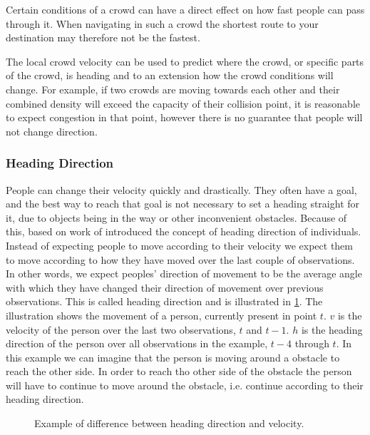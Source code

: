 Certain conditions of a crowd can have a direct effect on how fast people can pass through it. When navigating in such a crowd the shortest route to your destination may therefore not be the fastest.

The local crowd velocity can be used to predict where the crowd, or specific parts of the crowd, is heading and to an extension how the crowd conditions will change. For example, if two crowds are moving towards each other and their combined density will exceed the capacity of their collision point, it is reasonable to expect congestion in that point, however there is no guarantee that people will not change direction. 


\subsubsection{Heading Direction}\label{subsubsec:headingDirection}
People can change their velocity quickly and drastically. They often have a goal, and the best way to reach that goal is not necessary to set a heading straight for it, due to objects being in the way or other inconvenient obstacles. Because of this, \citet{wirz2012inferring} based on work of \citet{localTrendStatistics} introduced the concept of heading direction of individuals. Instead of expecting people to move according to their velocity we expect them to move according to how they have moved over the last couple of observations. In other words, we expect peoples' direction of movement to be the average angle with which they have changed their direction of movement over previous observations. This is called heading direction and is illustrated in \cref{fig:headingvsvelocity}. The illustration shows the movement of a person, currently present in point $t$. $v$ is the velocity of the person over the last two observations, $t$ and $t-1$. $h$ is the heading direction of the person over all observations in the example, $t-4$ through $t$. In this example we can imagine that the person is moving around a obstacle to reach the other side. In order to reach tho other side of the obstacle the person will have to continue to move around the obstacle, i.e. continue according to their heading direction.

\begin{figure}[htbp]
\centering
{}
\caption{Example of difference between heading direction and velocity.}
\label{fig:headingvsvelocity}
\end{figure}

